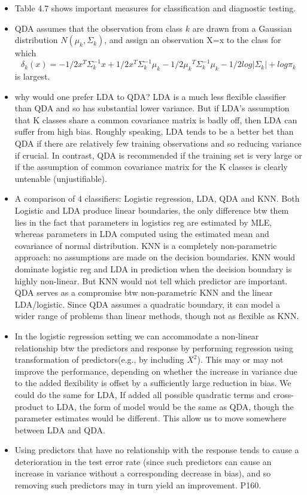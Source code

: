 \documentclass[a4paper, 12pt]{article}
\begin{document}
\begin{itemize}
	\item Table 4.7 shows important measures for classification and diagnostic testing.
	\item QDA assumes that the observation from class $k$ are drawn from a Gaussian distribution $N(\mu_k,\Sigma_k)$, and assign an observation X=x to the class for which \[
	\delta_k(x)=-1/2x^T{\Sigma_k^{-1}}x + 1/2x^T{\Sigma_k^{-1}}\mu_k -1/2{\mu_k}^T{\Sigma_k^{-1}}\mu_k -1/2 log|\Sigma_k| + log\pi_k
	\]
	is largest.
	\item why would one prefer LDA  to QDA? LDA is a much less flexible classifier than QDA and so has substantial lower variance. But if LDA's assumption that K classes share a common covariance matrix is badly off, then LDA can suffer from high bias. Roughly speaking, LDA tends to be a better bet than QDA if there are relatively few training observations and so reducing variance if crucial. In contrast, QDA is recommended if the training set is very large or if the assumption of common covariance matrix for the K classes is clearly untenable (unjustifiable).
	\item A comparison of 4 classifiers: Logistic regression, LDA, QDA and KNN. Both Logistic and LDA produce linear boundaries, the only difference btw them lies in the fact that parameters in logistics reg are estimated by MLE, whereas parameters in LDA computed using the estimated mean and covariance of normal distribution. KNN is a completely non-parametric approach: no assumptions are made on the decision boundaries. KNN would dominate logistic reg and LDA in prediction when the decision boundary is highly non-linear. But KNN would not tell which predictor are important. QDA serves as a compromise btw non-parametric KNN and the linear LDA/logistic. Since QDA assumes a quadratic boundary, it can model a wider range of problems than linear methods, though not as flexible as KNN.
	\item In the logistic regression setting we can accommodate a non-linear relationship btw the predictors and response by performing regression using transformation of predictors(e.g., by including $X^2$). This may or may not improve the performance, depending on whether the increase in variance due to the added flexibility is offset by a sufficiently large reduction in bias. We could do the same for LDA, If added all possible quadratic terms and cross-product to LDA, the form of model would be the same as QDA, though the parameter estimates would be different. This allow us to move somewhere between LDA and QDA.
	\item Using predictors that have no relationship with the response tends to cause a deterioration in the test error rate (since such predictors can cause an increase in variance without a corresponding decrease in bias), and so removing such predictors may in turn yield an improvement. P160.

\end{itemize}
\end{document}
